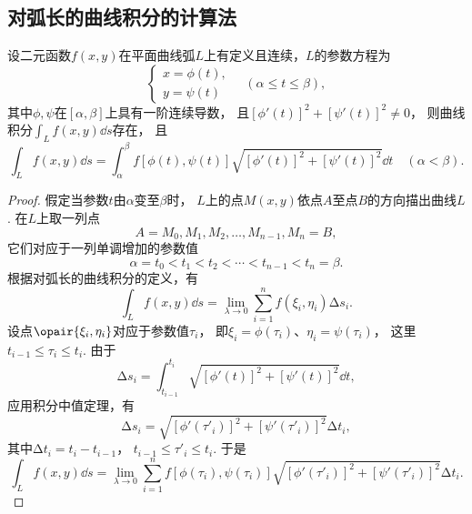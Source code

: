 \subsection{对弧长的曲线积分的计算法}
\begin{theorem}
设二元函数\(f(x,y)\)在平面曲线弧\(L\)上有定义且连续，\(L\)的参数方程为\begin{equation*}
	\left\{ \begin{array}{l}
		x = \phi(t), \\
		y = \psi(t)
	\end{array} \right.
	\quad(\alpha \leq t \leq \beta),
\end{equation*}
其中\(\phi,\psi\)在\([\alpha,\beta]\)上具有一阶连续导数，
且\([\phi'(t)]^2+[\psi'(t)]^2 \neq 0\)，
则曲线积分\(\int_L f(x,y) \dd{s}\)存在，
且\begin{equation}\label{equation:线积分与面积分.第一类曲线积分的计算式1}
	\int_L f(x,y) \dd{s}
	= \int_\alpha^\beta f[\phi(t),\psi(t)] \sqrt{[\phi'(t)]^2+[\psi'(t)]^2} \dd{t}
	\quad(\alpha<\beta).
\end{equation}
\begin{proof}
假定当参数\(t\)由\(\alpha\)变至\(\beta\)时，
\(L\)上的点\(M(x,y)\)依点\(A\)至点\(B\)的方向描出曲线\(L\).
在\(L\)上取一列点\begin{equation*}
	A=M_0,M_1,M_2,\dotsc,M_{n-1},M_n=B,
\end{equation*}
它们对应于一列单调增加的参数值\begin{equation*}
	\alpha=t_0<t_1<t_2<\dotsb<t_{n-1}<t_n=\beta.
\end{equation*}
根据对弧长的曲线积分的定义，有\begin{equation*}
	\int_L f(x,y) \dd{s} = \lim_{\lambda\to0} \sum_{i=1}^n f(\xi_i,\eta_i) \increment s_i.
\end{equation*}
设点\(\opair{\xi_i,\eta_i}\)对应于参数值\(\tau_i\)，
即\(\xi_i=\phi(\tau_i)\)、\(\eta_i=\psi(\tau_i)\)，
这里\(t_{i-1}\leq\tau_i\leq t_i\).
由于\begin{equation*}
	\increment s_i = \int_{t_{i-1}}^{t_i} \sqrt{[\phi'(t)]^2+[\psi'(t)]^2} \dd{t},
\end{equation*}
应用积分中值定理，有\begin{equation*}
	\increment s_i = \sqrt{[\phi'(\tau'_i)]^2+[\psi'(\tau'_i)]^2} \increment t_i,
\end{equation*}
其中\(\increment t_i = t_i - t_{i-1}\)，
\(t_{i-1} \leq \tau'_i \leq t_i\).
于是\begin{equation*}
	\int_L f(x,y) \dd{s}
	= \lim_{\lambda\to0} \sum_{i=1}^n f[\phi(\tau_i),\psi(\tau_i)] \sqrt{[\phi'(\tau'_i)]^2+[\psi'(\tau'_i)]^2} \increment t_i.

\end{equation*}
\end{proof}
\end{theorem}
